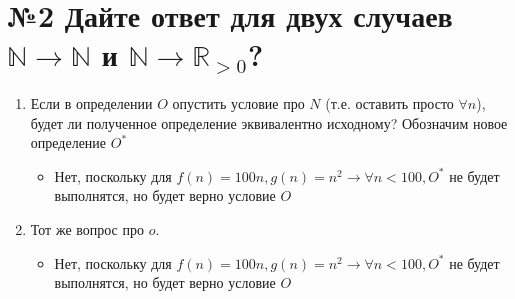 
\section*{№2 Дайте ответ для двух случаев $\mathbb{N} \to \mathbb{N}$ и $\mathbb{N} \to \mathbb{R}_{>0}$?}
\begin{enumerate}
    \item
      Если в определении $O$ опустить условие про $N$ (т.е. оставить
      просто $\forall n$), будет ли полученное определение эквивалентно
      исходному? Обозначим новое определение $O^*$

      \begin{itemize}
        \item
         Нет,  поскольку для $f(n)=100n, g(n)=n^2 \rightarrow \forall n < 100, O^*$ не будет выполнятся, но будет верно условие $O$
       
      \end{itemize}
  
    \item
      Тот же вопрос про $o$.
      \begin{itemize}
        \item
         Нет,  поскольку для $f(n)=100n, g(n)=n^2 \rightarrow \forall n < 100, O^*$ не будет выполнятся, но будет верно условие $O$
       
      \end{itemize}
  
  \end{enumerate}
